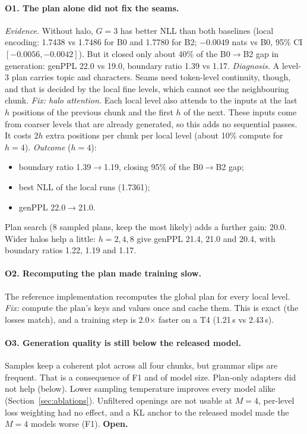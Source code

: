 \paragraph{O1. The plan alone did not fix the seams.}
\emph{Evidence.} Without halo, $G{=}3$ has better NLL than both baselines (local encoding: 1.7438 vs 1.7486 for B0
and 1.7780 for B2; $-0.0049$ nats vs B0, 95\% CI $[-0.0056,-0.0042]$). But it closed only about 40\% of the B0$\to$B2 gap in generation: genPPL
22.0 vs 19.0, boundary ratio 1.39 vs 1.17.
\emph{Diagnosis.} A level-3 plan carries topic and characters. Seams need token-level continuity, though, and
that is decided by the local fine levels, which cannot see the neighbouring chunk.
\emph{Fix: halo attention.} Each local level also attends to the inputs at the last $h$ positions of the previous
chunk and the first $h$ of the next. These inputs come from coarser levels that are already generated, so this
adds no sequential passes. It costs $2h$ extra positions per chunk per local level (about 10\% compute for $h{=}4$).
\emph{Outcome} ($h{=}4$):
\begin{itemize}[nosep]
  \item boundary ratio 1.39$\to$1.19, closing 95\% of the B0$\to$B2 gap;
  \item best NLL of the local runs (1.7361);
  \item genPPL 22.0$\to$21.0.
\end{itemize}
Plan search (8 sampled plans, keep the most likely) adds a further gain: 20.0. Wider halos help a little:
$h=2,4,8$ give genPPL 21.4, 21.0 and 20.4, with boundary ratios 1.22, 1.19 and 1.17.

\paragraph{O2. Recomputing the plan made training slow.}
The reference implementation recomputes the global plan for every local level.
\emph{Fix:} compute the plan's keys and values once and cache them. This is exact (the losses match), and a
training step is 2.0$\times$ faster on a T4 (1.21\,s vs 2.43\,s).

\paragraph{O3. Generation quality is still below the released model.}
Samples keep a coherent plot across all four chunks, but grammar slips are frequent. That is a consequence of F1
and of model size. Plan-only adapters did not help (below). Lower sampling temperature improves every model alike
(Section~\ref{sec:ablations}). Unfiltered openings are not usable at $M{=}4$, per-level loss weighting had no effect, and a KL anchor to
the released model made the $M{=}4$ models worse (F1).
\textbf{Open.}

